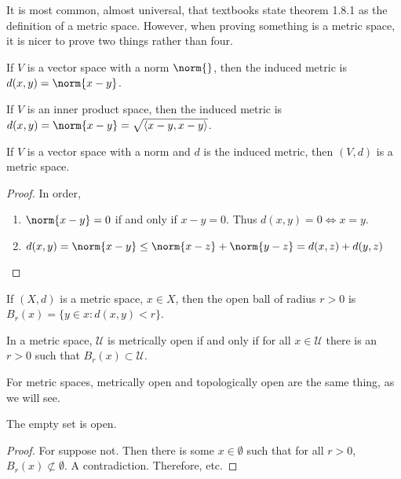 \documentclass[crop=false,class=article,oneside]{standalone}
\begin{document}
        \begin{remark}
        It is most common, almost universal, that textbooks state theorem 1.8.1 as the definition of a metric space. However, when proving something is a metric space, it is nicer to prove two things rather than four.
        \end{remark}
        \begin{definition}
        If $V$ is a vector space with a norm $\norm{}$, then the induced metric is $d(x,y) = \norm{x-y}$.
        \end{definition}
        \begin{remark}
        If $V$ is an inner product space, then the induced metric is $d(x,y) = \norm{x-y} = \sqrt{\langle x-y,x-y\rangle }$.
        \end{remark}
        \begin{theorem}
        If $V$ is a vector space with a norm and $d$ is the induced metric, then $(V,d)$ is a metric space.
        \end{theorem}
        \begin{proof}
        In order,
        \begin{enumerate}
        \item $\norm{x-y} = 0$ if and only if $x-y = 0$. Thus $d(x,y) = 0 \Leftrightarrow x=y$.
        \item $d(x,y) = \norm{x-y}\leq \norm{x-z}+\norm{y-z} = d(x,z)+d(y,z)$
        \end{enumerate}
        \end{proof}
        \begin{definition}
        If $(X,d)$ is a metric space, $x\in X$, then the open ball of radius $r>0$ is $B_{r}(x) = \{y\in x: d(x,y)<r\}$.
        \end{definition}
        \begin{definition}
        In a metric space, $\mathcal{U}$ is metrically open if and only if for all $x\in \mathcal{U}$ there is an $r>0$ such that $B_{r}(x)\subset \mathcal{U}$.
        \end{definition}
        \begin{remark}
        For metric spaces, metrically open and topologically open are the same thing, as we will see.
        \end{remark} 
        \begin{theorem}
        The empty set is open.
        \end{theorem}
        \begin{proof}
        For suppose not. Then there is some $x\in \emptyset$ such that for all $r>0$, $B_{r}(x)\not\subset \emptyset$. A contradiction. Therefore, etc.
        \end{proof}
\end{document}
